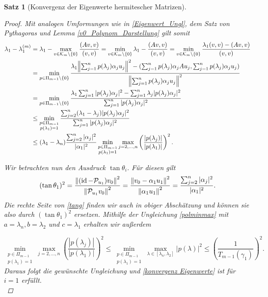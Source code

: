 \documentclass{article}
\theoremstyle{plain}
\newtheorem{theorem}    {Satz}   [section]
\begin{document}
\begin{theorem}[Konvergenz der Eigenwerte hermitescher Matrizen]
\begin{proof}
	Mit analogen Umformungen wie in \eqref{Eigenwert_Ungl}, dem Satz von Pythagoras und Lemma \ref{v0_Polynom_Darstellung} gilt somit
	\begin{equation}
		\label{Ungl i=1}
		\begin{aligned}
			\lambda_1 - \lambda_1^{(m)} &= \lambda_1 - \max_{v \in \mathcal{K}_m \setminus\{0\}} \frac{(Av,v)}{(v,v)} = \min_{v \in \mathcal{K}_m\setminus\{0\}} \lambda_1 - \frac{(Av,v)}{(v,v)} = \min_{v \in \mathcal{K}_m\setminus\{0\}} \frac{\lambda_1(v,v) - (Av,v)}{(v,v)} \\ &= \min_{p\in \Pi_{m-1}\setminus \{0\}} \frac{\lambda_1 {\left \| \sum_{j=1}^{n}p(\lambda_j)\alpha_j u_j \right \|}_{}^2 - (\sum_{j=1}^{n}p(\lambda_j)\alpha_j A u_j,\sum_{j=1}^{n}p(\lambda_j)\alpha_j u_j)}{{\left \| \sum_{j=1}^{n}p(\lambda_j)\alpha_j u_j \right \|}_{}^2} \\
			&= \min_{p\in \Pi_{m-1}\setminus \{0\}} \frac{\lambda_1 \sum_{j=1}^{n} |p(\lambda_j)\alpha_j|^2 - \sum_{j=1}^{n} \lambda_j |p(\lambda_j)\alpha_j|^2 }{\sum_{j=1}^{n} |p(\lambda_j)\alpha_j|^2} \\
			&\le \min_{\substack{p\in \Pi_{m-1} \\ p(\lambda_1) =1}} \frac{\sum_{j=2}^{n} (\lambda_1 - \lambda_j)|p(\lambda_j)\alpha_j|^2}{\sum_{j=1}^{n} |p(\lambda_j)\alpha_j|^2} \\
			&\le (\lambda_1 - \lambda_n) \frac{\sum_{j=2}^{n} |\alpha_j|^2}{|\alpha_1|^2} \min_{\substack{p\in \Pi_{m-1} \\ p(\lambda_1) =1}} \max_{j=2,\dots,n} \left(\frac{|p(\lambda_j)|}{|p(\lambda_1)|}\right)^2.
		\end{aligned}
	\end{equation}

	Wir betrachten nun den Ausdruck $\tan \theta_i$. Für diesen gilt
		\begin{align}\label{tang}
			(\tan\theta_1)^2 = \frac{{\left \| (\operatorname{id} - \mathcal{P}_{u_1})v_0 \right \|}_{}^2}{{\left \|  \mathcal{P}_{u_1}v_0 \right \|}_{}^2} = \frac{{\left \| v_0 - \alpha_1 u_1 \right \|}_{}^2}{{\left \| \alpha_1 u_1 \right \|}_{}^2} = \frac{\sum_{j=2}^{n} |\alpha_j|^2}{|\alpha_1|^2}.
		\end{align}
	Die rechte Seite von \eqref{tang} finden wir auch in obiger Abschätzung und können sie also durch $(\tan\theta_1)^2$ ersetzen.
	Mithilfe der Ungleichung \eqref{polminmax} mit $a = \lambda_n, b= \lambda_2$ und $c= \lambda_1$ erhalten wir außerdem

		\begin{equation*}
			\min_{\substack{p\in \Pi_{m-1} \\ p(\lambda_1) = 1}} \max_{j=2,\dots,n} 	\left(\frac{|p(\lambda_j)|}{|p(\lambda_1)|}\right)^2 \le \min_{\substack{p\in \Pi_{m-1} \\ p(\lambda_1) = 1}} \max_{\lambda \in [\lambda_n,\lambda_2]} |p(\lambda)|^2 \le \left(\frac{1}{T_{m-1}(\gamma_1)}\right)^2.
		\end{equation*}
	Daraus folgt die gewünschte Ungleichung und \eqref{konvergenz Eigenwerte} ist für $i = 1$ erfüllt.\\


\end{proof}
\end{theorem}
\end{document}

